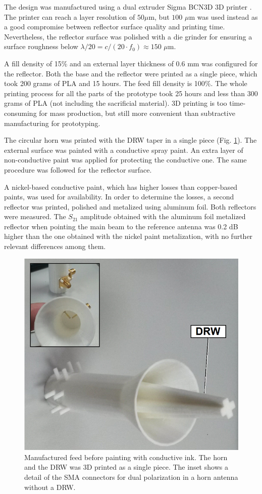 \documentclass{IEEEtran}
\begin{document}
The design was manufactured using a dual extruder Sigma BCN3D 3D printer \cite{ref:BCN3D}. The printer can reach a layer resolution of $50 \mu$m, but $100$ $\mu$m was used instead as a good compromise between reflector surface quality and printing time. Nevertheless, the reflector surface was polished with a die grinder for ensuring a surface roughness below $\lambda/20=c/(20\cdot f_0)\approx150$ $\mu$m.

A fill density of 15\% and an external layer thickness of 0.6 mm was configured for the reflector. Both the base and the reflector were printed as a single piece, which took 200 grams of PLA and 15 hours.  The feed fill density is 100\%. The whole printing process for all the parts of the prototype took 25 hours and less than 300 grams of PLA (not including the sacrificial material). 3D printing is too time-consuming for mass production, but still more convenient than subtractive manufacturing for prototyping.


The circular horn was printed with the DRW taper in a single piece (Fig. \ref{fig:FeedHorn}). The external surface was painted with a conductive spray paint. An extra layer of non-conductive paint was applied for protecting the conductive one. The same procedure was followed for the reflector surface.

A nickel-based conductive paint, which has higher losses than copper-based paints, was used for availability. In order to determine the losses, a second reflector was printed, polished and metalized using aluminum foil. Both reflectors were measured. The $S_{21}$ amplitude obtained with the aluminum foil metalized reflector when pointing the main beam to the reference antenna was 0.2 dB higher than the one obtained with the nickel paint metalization, with no further relevant differences among them.  

\begin{figure}[h]
	\centerline{\includegraphics[width=0.6\columnwidth]{images/Feed.png}}
	\caption{Manufactured feed before painting with conductive ink. The horn and the DRW was 3D printed as a single piece. The inset shows a detail of the SMA connectors for dual polarization in a horn antenna without a DRW.}
	\label{fig:FeedHorn}
\end{figure}
\end{document}
